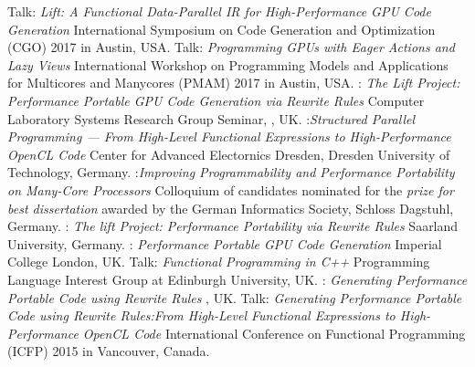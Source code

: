          {Talk: \emph{Lift: A Functional Data-Parallel IR for High-Performance GPU Code Generation}\newline
          \small International Symposium on Code Generation and Optimization (CGO) 2017 in Austin, USA.}
         {Talk: \emph{Programming GPUs with Eager Actions and Lazy Views}\newline
          \small  International Workshop on Programming Models and Applications for Multicores and Manycores (PMAM) 2017 in Austin, USA.}
         {: \emph{The Lift Project: Performance Portable GPU Code Generation via Rewrite Rules}\newline
         Computer Laboratory Systems Research Group Seminar, , UK.
         }
         {:\newline \emph{Structured Parallel Programming --- From High-Level Functional Expressions to High-Performance OpenCL Code}\newline
         Center for Advanced Electornics Dresden, Dresden University of Technology, Germany.
         }
         {:\newline \emph{Improving Programmability and Performance Portability on Many-Core Processors}\newline
         \small Colloquium of candidates nominated for the \emph{prize for best dissertation} awarded by the German Informatics Society, Schloss Dagstuhl, Germany.}
         {: \emph{The lift Project: Performance Portability via Rewrite Rules}\newline
          \small Saarland University, Germany.}
         {: \emph{Performance Portable GPU Code Generation}\newline
         \small Imperial College London, UK.}
         {Talk: \emph{Functional Programming in C++}\newline
         \small Programming Language Interest Group at Edinburgh University, UK.}
         {: \emph{Generating Performance Portable Code using Rewrite Rules}\newline
         \small {}, UK.}
         {Talk: \emph{Generating Performance Portable Code using Rewrite Rules:\newline From High-Level Functional Expressions to High-Performance OpenCL Code}\newline
         \small International Conference on Functional Programming (ICFP) 2015 in Vancouver, Canada.}
